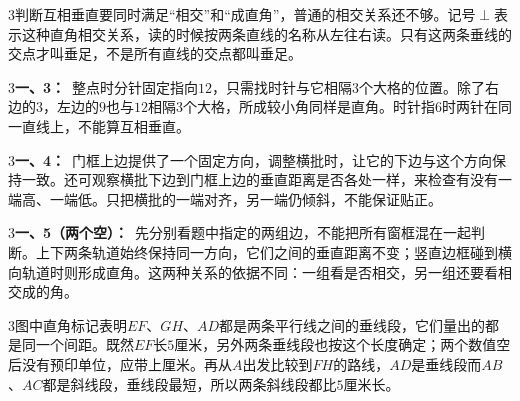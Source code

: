 \documentclass[multi=snippet,border={5bp 20bp 5bp 5bp}]{standalone}
\newenvironment{snippet}[3]{\begin{minipage}{#1bp}\color{answerred}\fontsize{#2}{#3}\selectfont\raggedright}{\end{minipage}}
\begin{document}
\begin{snippet}{505}{11.5}{14}\begin{multicols}{3}\raggedcolumns 判断互相垂直要同时满足“相交”和“成直角”，普通的相交关系还不够。记号\(\perp\)\allowbreak 表示这种直角相交关系，读的时候按两条直线的名称从左往右读。只有这两条垂线的交点才叫垂足，不是所有直线的交点都叫垂足。\end{multicols}\end{snippet}
\begin{snippet}{505}{11.5}{14}\begin{multicols}{3}\raggedcolumns \textbf{一、3：}\ 整点时分针固定指向\(12\)\allowbreak ，只需找时针与它相隔\(3\)\allowbreak 个大格的位置。除了右边的\(3\)\allowbreak ，左边的\(9\)\allowbreak 也与\(12\)\allowbreak 相隔\(3\)\allowbreak 个大格，所成较小角同样是直角。时针指\(6\)\allowbreak 时两针在同一直线上，不能算互相垂直。\end{multicols}\end{snippet}
\begin{snippet}{505}{11.5}{14}\begin{multicols}{3}\raggedcolumns \textbf{一、4：}\ 门框上边提供了一个固定方向，调整横批时，让它的下边与这个方向保持一致。还可观察横批下边到门框上边的垂直距离是否各处一样，来检查有没有一端高、一端低。只把横批的一端对齐，另一端仍倾斜，不能保证贴正。\end{multicols}\end{snippet}
\begin{snippet}{505}{11.5}{14}\begin{multicols}{3}\raggedcolumns \textbf{一、5（两个空）：}\ 先分别看题中指定的两组边，不能把所有窗框混在一起判断。上下两条轨道始终保持同一方向，它们之间的垂直距离不变；竖直边框碰到横向轨道时则形成直角。这两种关系的依据不同：一组看是否相交，另一组还要看相交成的角。\end{multicols}\end{snippet}
\begin{snippet}{505}{11.5}{14}\begin{multicols}{3}\raggedcolumns 图中直角标记表明\(EF\)\allowbreak 、\(GH\)\allowbreak 、\(AD\)\allowbreak 都是两条平行线之间的垂线段，它们量出的都是同一个间距。既然\(EF\)\allowbreak 长\(5\)\allowbreak 厘米，另外两条垂线段也按这个长度确定；两个数值空后没有预印单位，应带上厘米。再从\(A\)\allowbreak 出发比较到\(FH\)\allowbreak 的路线，\(AD\)\allowbreak 是垂线段而\(AB\)\allowbreak 、\(AC\)\allowbreak 都是斜线段，垂线段最短，所以两条斜线段都比\(5\)\allowbreak 厘米长。\end{multicols}\end{snippet}
\end{document}
